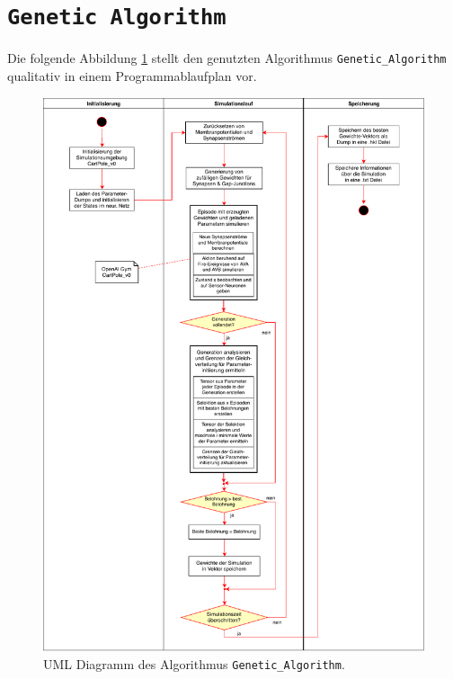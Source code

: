 	\section{\texttt{Genetic Algorithm}}
	\label{app:UML_GA}
	\enlargethispage{2\baselineskip}
	Die folgende Abbildung \ref{fig:uml_ga} stellt den genutzten Algorithmus \texttt{Genetic\_Algorithm} qualitativ in einem Programmablaufplan vor.
	\begin{figure}[H]
		\centering
		\includegraphics[width=14cm]{figures/appendix/uml_ga.pdf}
		\caption{UML Diagramm des Algorithmus \texttt{Genetic\_Algorithm}.}
		\label{fig:uml_ga}
	\end{figure}
	
